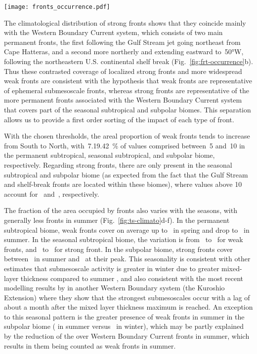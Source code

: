 \begin{figure*}
  \texttt{[image: fronts\_occurrence.pdf]}
  \caption{
    occurrence of (a)~weak fronts and (b)~strong fronts expressed as the percentage of time over the entire time series~(2000--2020) that a given pixel is occupied by a front.
  }%
  \label{fig:frt-occurrence}
\end{figure*}

The climatological distribution of strong fronts shows that they coincide mainly with the Western Boundary Current system, which consists of two main permanent fronts, the first following the Gulf Stream jet going northeast from Cape Hatteras, and a second more northerly and extending eastward to~\ang{50}W, following the northeastern U.S.
continental shelf break (Fig.~\ref{fig:frt-occurrence}b).
Thus these contrasted coverage of localized strong fronts and more widespread weak fronts are consistent with the hypothesis that weak fronts are representative of ephemeral submesoscale fronts, whereas strong fronts are representative of the more permanent fronts associated with the Western Boundary Current system that covers part of the seasonal subtropical and subpolar biomes.
This separation allows us to provide a first order sorting of the impact of each type of front.

With the chosen thresholds, the areal proportion of weak fronts tends to increase from South to North, with~\qtylist{7,19,42}{\percent} of  values comprised between~5 and~10 in the permanent subtropical, seasonal subtropical, and subpolar biome, respectively.
Regarding strong fronts, there are only present in the seasonal subtropical and subpolar biome (as expected from the fact that the Gulf Stream and shelf-break fronts are located within these biomes), where  values above 10 account for~ and~, respectively.

The fraction of the area occupied by fronts also varies with the seasons, with generally less fronts in summer (Fig.~\ref{fig:ts-climato}d-f).
In the permanent subtropical biome, weak fronts cover on average up to~ in spring and drop to~ in summer.
In the seasonal subtropical biome, the variation is from~ to~ for weak fronts, and~ to~ for strong front.
In the subpolar biome, strong fronts cover between~ in summer and~ at their peak.
This seasonality is consistent with other estimates that submesoscale activity is greater in winter due to greater mixed-layer thickness compared to summer \parencite{callies_2015}, and also consistent with the most recent modelling results by \textcite{dong_2020} in another Western Boundary system (the Kuroshio Extension) where they show that the strongest submesoscales occur with a lag of about a month after the mixed layer thickness maximum is reached.
An exception to this seasonal pattern is the greater presence of weak fronts in summer in the subpolar biome ( in summer versus~ in winter), which may be partly explained by the reduction of the  over Western Boundary Current fronts in summer, which results in them being counted as weak fronts in summer.


